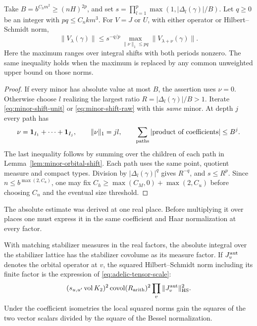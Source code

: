\begin{auxlemma}
\label{lem:minor-orbital-iterate}
Take \(B=b^{C_hm^2}\ge(nH)^{2p}\), and set
\(s=\prod_{l=1}^p\max(1,|\Delta_l(\gamma)|/B)\).
Let \(q\ge0\) be an integer with \(pq\le C_nkm^3\).
For \(V=J\) or \(U\), with either operator or Hilbert--Schmidt norm,
\[
 \|V_\lambda(\gamma)\|
 \le s^{-q/p}\max_{\|\nu\|_1\le pq}\|V_{\lambda+\nu}(\gamma)\|.
\]
Here the maximum ranges over integral shifts with both periods nonzero.
The same inequality holds when the maximum is replaced by any common
unweighted upper bound on those norms.
\end{auxlemma}
\begin{proof}
If every minor has absolute value at most \(B\), the assertion uses
\(\nu=0\). Otherwise choose \(l\) realizing the largest ratio
\(R=|\Delta_l(\gamma)|/B>1\). Iterate \eqref{eq:minor-shift-unit}
or \eqref{eq:minor-shift-raw} with this \emph{same} minor. At depth
\(j\) every path has
\[
 \nu=\mathbf1_{I_1}+\cdots+\mathbf1_{I_j},\qquad
 \|\nu\|_1=jl,\qquad
 \sum_{\rm paths}|\text{product of coefficients}|\le B^j .
\]
The last inequality follows by summing over the children of each
path in Lemma~\ref{lem:minor-orbital-shift}. Each path uses the same
point, quotient measure and compact types. Division by
\(|\Delta_l(\gamma)|^q\) gives \(R^{-q}\), and \(s\le R^p\).
Since \(n\le b^{\max(2,C_u)}\), one may fix
\(C_h\ge\max(C_M,0)+\max(2,C_u)\) before choosing \(C_n\) and the
eventual size threshold.
\end{proof}

The absolute estimate was derived at one real place. Before multiplying it over places one must express it in the same coefficient and Haar normalization at every factor.

\begin{proposition}\label{prop:tensor-cell-norm}
With matching stabilizer measures in the real factors, the absolute
integral over the stabilizer lattice has the stabilizer covolume
as its measure factor. If \(J_v^{\rm aut}\) denotes the orbital operator at \(v\), the squared Hilbert--Schmidt norm including its finite factor is the expression of \eqref{eq:adelic-tensor-scale}: 
\[
 (s_{u,u'}\operatorname{vol}K_2)^2\operatorname{covol}(R_{\rm arith})^2\prod_v\|J_v^{\rm aut}\|_{\rm HS}^2.
\]
 Under the coefficient isometries
the local squared norms gain the squares of the two vector
scalars divided by the square of the Bessel normalization.
\end{proposition}

